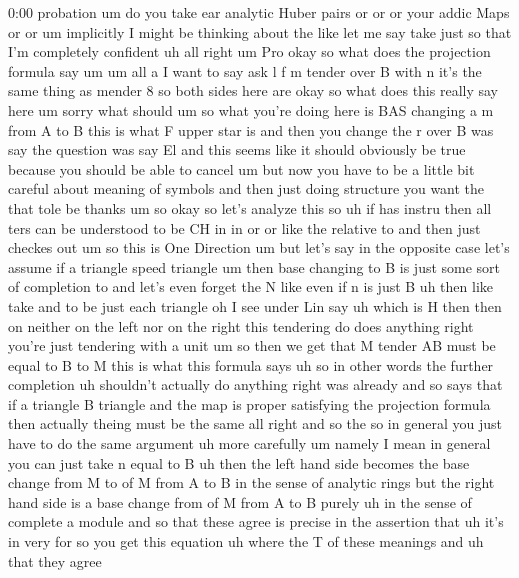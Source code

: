 \begin{unfinished}{0:00}
probation
um  do  you  take  ear  analytic  Huber  pairs
or  or  or  your  addic  Maps  or
or  um  implicitly  I  might  be  thinking
about  the  like  let  me  say  take  just  so
that  I'm  completely  confident
uh
all  right  um
Pro  okay  so  what  does  the  projection
formula  say
um
um  all
a
I  want  to  say  ask  l
f  m  tender  over  B  with  n  it's  the  same
thing  as  mender
8  so  both  sides  here  are
okay  so  what  does  this
really  say  here
um
sorry  what  should
um
so  what  you're  doing  here  is  BAS
changing
a  m  from  A  to
B  this  is  what  F  upper  star  is  and  then
you  change  the  r  over
B  was
say  the  question  was  say
El  and  this  seems  like  it  should
obviously  be  true  because  you  should  be
able  to
cancel  um  but  now  you  have  to  be  a
little  bit  careful  about  meaning  of
symbols
and  then  just  doing  structure  you  want
the  that  tole
be
thanks  um  so  okay  so  let's  analyze  this
so
uh  if  has
instru  then  all  ters  can  be  understood
to  be  CH
in
in  or  or  like  the  relative  to  and  then
just  checkes
out
um  so  this  is  One
Direction  um  but  let's  say  in  the
opposite  case  let's  assume  if  a  triangle
speed
triangle  um  then  base  changing  to  B  is
just  some  sort  of
completion
to  and  let's  even  forget  the  N  like  even
if  n  is  just
B
uh
then  like
take  and  to  be  just  each
triangle  oh  I  see  under  Lin  say
uh  which  is
H  then  then  on  neither  on  the  left  nor
on  the  right  this  tendering  do  does
anything  right  you're  just  tendering
with  a  unit  um  so  then  we
get  that  M  tender  AB  must  be  equal  to  B
to
M  this  is  what  this  formula
says
uh  so  in  other  words  the  further
completion  uh  shouldn't  actually  do
anything
right  was
already  and  so  says  that  if  a  triangle  B
triangle  and  the  map  is  proper
satisfying  the  projection  formula  then
actually  theing  must  be  the
same
all  right  and  so  the  so  in  general  you
just  have  to  do  the  same  argument  uh
more  carefully
um  namely  I  mean  in  general  you  can  just
take  n  equal  to  B  uh  then  the  left  hand
side  becomes  the  base  change  from  M  to
of  M  from  A  to  B  in  the  sense  of
analytic  rings  but  the  right  hand  side
is  a  base  change  from  of  M  from  A  to  B
purely  uh  in  the  sense  of  complete  a
module
and  so  that  these  agree  is  precise  in
the  assertion  that  uh  it's  in
very
for
so  you  get  this  equation  uh  where  the  T
of  these  meanings  and  uh  that  they  agree

\end{unfinished}
